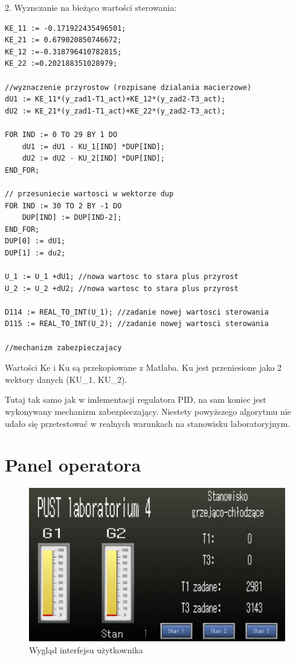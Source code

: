 2. Wyznczanie na bieżąco wartości sterowania:
\begin{lstlisting}[style=customc,frame=single, label=lst:overheat_lock] 
KE_11 := -0.171922435496501;
KE_21 := 0.679020850746672;
KE_12 :=-0.318796410782815;
KE_22 :=0.202188351028979;

//wyznaczenie przyrostow (rozpisane dzialania macierzowe)
dU1 := KE_11*(y_zad1-T1_act)+KE_12*(y_zad2-T3_act);
dU2 := KE_21*(y_zad1-T1_act)+KE_22*(y_zad2-T3_act);

FOR IND := 0 TO 29 BY 1 DO
	dU1 := dU1 - KU_1[IND] *DUP[IND];
	dU2 := dU2 - KU_2[IND] *DUP[IND];
END_FOR;

// przesuniecie wartosci w wektorze dup
FOR IND := 30 TO 2 BY -1 DO
	DUP[IND] := DUP[IND-2];
END_FOR;
DUP[0] := dU1; 
DUP[1] := du2;

U_1 := U_1 +dU1; //nowa wartosc to stara plus przyrost
U_2 := U_2 +dU2; //nowa wartosc to stara plus przyrost

D114 := REAL_TO_INT(U_1); //zadanie nowej wartosci sterowania
D115 := REAL_TO_INT(U_2); //zadanie nowej wartosci sterowania

//mechanizm zabezpieczajacy
\end{lstlisting} 
Wartości Ke i Ku są przekopiowane z Matlaba.  Ku jest przeniesione jako 2 wektory danych (KU\_1, KU\_2). 

Tutaj tak samo jak w imlementacji regulatora PID, na sam koniec jest wykonywany mechanizm zabezpieczający.
Niestety powyższego algorytmu nie udało się przetestować w realnych warunkach na stanowisku laboratoryjnym.

\section{Panel operatora}

 \begin{figure}[h]
    \centering
    \includegraphics[width=160mm]{../images/laby/podpunkt5.jpg}
    \caption{Wygląd interfejsu użytkownika}
    \label{fig:normal}
    \end{figure}  

